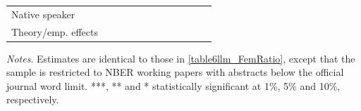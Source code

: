 \begin{table}
\begin{threeparttable}
\begin{tabular}{p{3cm}S@{}S@{}S@{}S@{}S@{}S@{}S@{}S@{}S@{}S@{}S@{}}
            Native speaker                &               &           {}   &               &           {}   &               &           {}   &               &           {}   &               &               &               \\
            Theory/emp. effects           &               &           {}   &               &           {}   &               &           {}   &               &           {}   &               &               &               \\
            \bottomrule
        \end{tabular}
        \begin{tablenotes}
            \tiny
            \item \textit{Notes}. Estimates are identical to those in \autoref{table6llm_FemRatio}, except that the sample is restricted to NBER working papers with abstracts below the official journal word limit. ***, ** and * statistically significant at 1\%, 5\% and 10\%, respectively.
        \end{tablenotes}
    \end{threeparttable}

\end{table}
